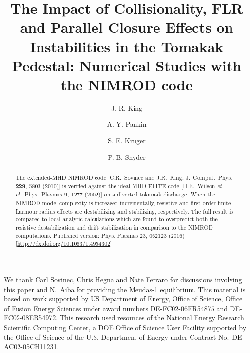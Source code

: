 \documentclass[english,aps,superscriptaddress,showkeys,showpacs,prepri,twocolumn]{revtex4}
\begin{document}
\title{
The Impact of Collisionality, FLR and Parallel Closure Effects on Instabilities
in the Tomakak Pedestal:   Numerical Studies with the NIMROD code
}

\author{J. R. King}

\author{A. Y. Pankin}

\author{S. E. Kruger}

\author{P. B. Snyder}

\begin{abstract}
The extended-MHD NIMROD code [C.R.~Sovinec and J.R.~King, J.~Comput.~Phys.~{\bf
229}, 5803 (2010)] is verified against the ideal-MHD ELITE code [H.R.~Wilson
\textit{et al.}~Phys.~Plasmas {\bf 9}, 1277 (2002)] on a diverted tokamak
discharge. When the NIMROD model complexity is increased incrementally,
resistive and first-order finite-Larmour radius effects are destabilizing and
stabilizing, respectively. The full result is compared to local analytic
calculations which are found to overpredict both the resistive destabilization
and drift stabilization in comparison to the NIMROD computations.
Published version: Phys. Plasmas 23, 062123 (2016) [\url{http://dx.doi.org/10.1063/1.4954302}]
\end{abstract}


\maketitle


   



 
\appendix

\begin{acknowledgments}
We thank Carl Sovinec, Chris Hegna and Nate Ferraro for discussions involving
this paper and N.~Aiba for providing the Meudas-1 equilibrium. This material is
based on work supported by US Department of Energy, Office of Science, Office
of Fusion Energy Sciences under award numbers DE-FC02-06ER54875 and
DE-FC02-08ER54972. This research used resources of the National Energy Research
Scientific Computing Center, a DOE Office of Science User Facility supported by
the Office of Science of the U.S. Department of Energy under Contract
No.~DE-AC02-05CH11231.
\end{acknowledgments}


\end{document}
